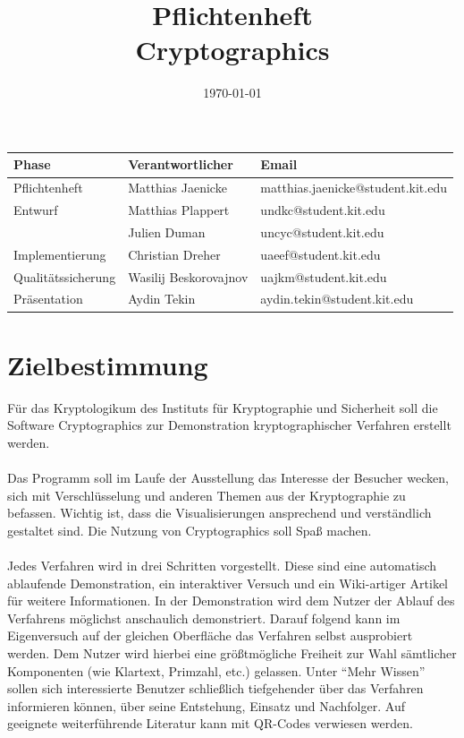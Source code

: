 \documentclass{article}
\title{\textbf{Pflichtenheft} \\ Cryptographics}
\author{}
\date{\today}
\begin{document}
\maketitle
\begin{table}[b]
  \begin{tabular}{| l | l | l |}
    \hline
    \textbf{Phase} & \textbf{Verantwortlicher} & \textbf{Email} \\ \hline
    Pflichtenheft & Matthias Jaenicke & matthias.jaenicke@student.kit.edu \\ \hline
    Entwurf & Matthias Plappert & undkc@student.kit.edu \\
            & Julien Duman & uncyc@student.kit.edu \\ \hline
    Implementierung & Christian Dreher & uaeef@student.kit.edu \\ \hline
    Qualitätssicherung & Wasilij Beskorovajnov & uajkm@student.kit.edu \\ \hline
    Präsentation & Aydin Tekin & aydin.tekin@student.kit.edu \\ \hline
    \end{tabular}
\end{table}
\thispagestyle{empty}
\newpage


\tableofcontents
\newpage

\section{Zielbestimmung}

Für das \gls{Kryptologikum} des Instituts für
Kryptographie und Sicherheit soll die Software \gls{Cryptographics} zur
Demonstration kryptographischer Verfahren erstellt werden. \\
\\
Das Programm soll im Laufe der Ausstellung das Interesse der Besucher wecken, sich mit Verschlüsselung und anderen Themen aus der Kryptographie zu befassen. Wichtig ist, dass die Visualisierungen ansprechend und verständlich gestaltet sind. Die Nutzung von \gls{Cryptographics} soll Spaß machen. \\
\\
Jedes Verfahren wird in drei Schritten vorgestellt. Diese sind eine automatisch ablaufende Demonstration, ein interaktiver Versuch und ein Wiki-artiger Artikel für weitere Informationen.
In der Demonstration wird dem Nutzer der Ablauf des Verfahrens möglichst anschaulich demonstriert. Darauf folgend kann im Eigenversuch auf der gleichen Oberfläche das Verfahren selbst ausprobiert werden. Dem Nutzer wird hierbei eine größtmögliche Freiheit zur Wahl sämtlicher Komponenten (wie Klartext, Primzahl, etc.) gelassen. Unter ``Mehr Wissen'' sollen sich interessierte Benutzer schließlich tiefgehender über das Verfahren informieren können, über seine Entstehung, Einsatz und Nachfolger. Auf geeignete weiterführende Literatur kann mit QR-Codes verwiesen werden. \\
\end{document}
